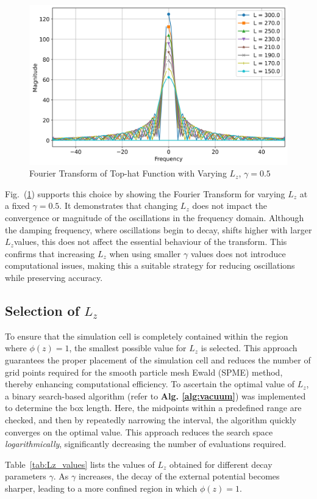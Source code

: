 \begin{figure}[htbp]
  \centering
  \includegraphics[width=\linewidth]{images/fourieroftophatvaryL_gamma0.5.jpg}
  \caption{Fourier Transform of Top-hat Function with Varying $L_z$, $\gamma = 0.5$}
  \label{fig:fourieroftophatvaryL_gamma0}
\end{figure}

Fig.~(\ref{fig:fourieroftophatvaryL_gamma0}) supports this choice by showing the Fourier Transform for varying $L_z$ at a fixed $\gamma = 0.5$. It demonstrates that changing $L_z$ does not impact the convergence or magnitude of the oscillations in the frequency domain. Although the damping frequency, where oscillations begin to decay, shifts higher with larger $L_z$values, this does not affect the essential behaviour of the transform. This confirms that increasing $L_z$ when using smaller $\gamma$ values does not introduce computational issues, making this a suitable strategy for reducing oscillations while preserving accuracy.

\subsection{Selection of  $L_z$}
To ensure that the simulation cell is completely contained within the region where $\phi(z) = 1$, the smallest possible value for $L_z$ is selected. This approach guarantees the proper placement of the simulation cell and reduces the number of grid points required for the smooth particle mesh Ewald (SPME) method, thereby enhancing computational efficiency. To ascertain the optimal value of $L_z$, a binary search-based algorithm (refer to \textbf{Alg. \ref{alg:vacuum}}) was implemented to determine the box length. Here, the midpoints within a predefined range are checked, and then by repeatedly narrowing the interval, the algorithm quickly converges on the optimal value. This approach reduces the search space \textit{logarithmically}, significantly decreasing the number of evaluations required.

Table~\ref{tab:Lz_values} lists the values of $L_z$ obtained for different decay parameters $\gamma$. As $\gamma$ increases, the decay of the external potential becomes sharper, leading to a more confined region in which $\phi(z) = 1$. 


